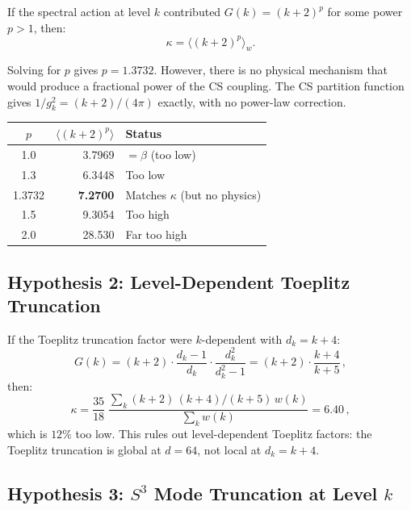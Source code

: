 \documentclass[12pt,a4paper]{article}
\theoremstyle{definition}
\theoremstyle{remark}
\begin{document}
If the spectral action at level $k$ contributed $G(k) = (k+2)^p$ for
some power $p > 1$, then:
\begin{equation}
\kappa = \langle (k+2)^p \rangle_w.
\end{equation}

Solving for $p$ gives $p = 1.3732$.  However, there is no physical
mechanism that would produce a fractional power of the CS coupling.
The CS partition function gives $1/g_k^2 = (k+2)/(4\pi)$ exactly,
with no power-law correction.

\begin{center}
\renewcommand{\arraystretch}{1.2}
\begin{tabular}{crl}
\toprule
$p$ & $\langle (k+2)^p \rangle$ & Status \\
\midrule
1.0 & 3.7969 & $= \beta$ (too low) \\
1.3 & 6.3448 & Too low \\
1.3732 & \textbf{7.2700} & Matches $\kappa$ (but no physics) \\
1.5 & 9.3054 & Too high \\
2.0 & 28.530 & Far too high \\
\bottomrule
\end{tabular}
\end{center}

\subsection{Hypothesis 2: Level-Dependent Toeplitz Truncation}

If the Toeplitz truncation factor were $k$-dependent with $d_k = k + 4$:
\begin{equation}
G(k) = (k+2) \cdot \frac{d_k - 1}{d_k} \cdot \frac{d_k^2}{d_k^2 - 1}
= (k+2) \cdot \frac{k+4}{k+5}\,,
\end{equation}
then:
\begin{equation}
\kappa = \frac{35}{18}\;\frac{\sum_k (k+2)\,(k+4)/(k+5)\,w(k)}
{\sum_k w(k)} = 6.40\,,
\end{equation}
which is $12\%$ too low.  This rules out level-dependent Toeplitz factors:
the Toeplitz truncation is global at $d = 64$, not local at $d_k = k + 4$.

\subsection{Hypothesis 3: $S^3$ Mode Truncation at Level $k$}
\end{document}
